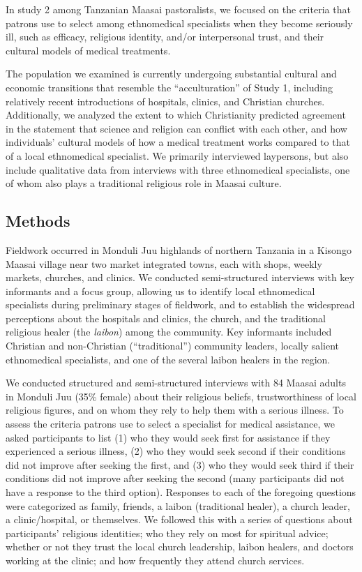 \documentclass[
  11pt,
]{article}
\begin{document}
In study 2 among Tanzanian Maasai pastoralists, we focused on the criteria that patrons use to select among ethnomedical specialists when they become seriously ill, such as efficacy, religious identity, and/or interpersonal trust, and their cultural models of medical treatments.

The population we examined is currently undergoing substantial cultural and economic transitions that resemble the ``acculturation'' of Study 1, including relatively recent introductions of hospitals, clinics, and Christian churches. Additionally, we analyzed the extent to which Christianity predicted agreement in the statement that science and religion can conflict with each other, and how individuals' cultural models of how a medical treatment works compared to that of a local ethnomedical specialist. We primarily interviewed laypersons, but also include qualitative data from interviews with three ethnomedical specialists, one of whom also plays a traditional religious role in Maasai culture.

\hypertarget{methods-1}{%
\subsection{Methods}\label{methods-1}}

Fieldwork occurred in Monduli Juu highlands of northern Tanzania in a Kisongo Maasai village near two market integrated towns, each with shops, weekly markets, churches, and clinics. We conducted semi-structured interviews with key informants and a focus group, allowing us to identify local ethnomedical specialists during preliminary stages of fieldwork, and to establish the widespread perceptions about the hospitals and clinics, the church, and the traditional religious healer (the \emph{laibon}) among the community. Key informants included Christian and non-Christian (``traditional'') community leaders, locally salient ethnomedical specialists, and one of the several laibon healers in the region.

We conducted structured and semi-structured interviews with 84 Maasai adults in Monduli Juu (35\% female) about their religious beliefs, trustworthiness of local religious figures, and on whom they rely to help them with a serious illness. To assess the criteria patrons use to select a specialist for medical assistance, we asked participants to list (1) who they would seek first for assistance if they experienced a serious illness, (2) who they would seek second if their conditions did not improve after seeking the first, and (3) who they would seek third if their conditions did not improve after seeking the second (many participants did not have a response to the third option). Responses to each of the foregoing questions were categorized as family, friends, a laibon (traditional healer), a church leader, a clinic/hospital, or themselves. We followed this with a series of questions about participants' religious identities; who they rely on most for spiritual advice; whether or not they trust the local church leadership, laibon healers, and doctors working at the clinic; and how frequently they attend church services.
\end{document}
